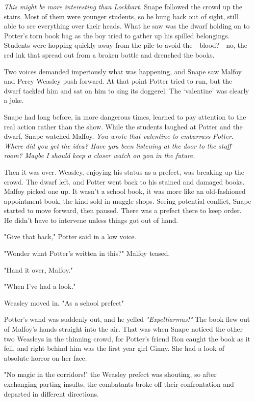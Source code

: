 \emph{This might be more interesting than Lockhart.} Snape followed the crowd up the stairs. Most of them were younger students, so he hung back out of sight, still able to see everything over their heads. What he saw was the dwarf holding on to Potter's torn book bag as the boy tried to gather up his spilled belongings. Students were hopping quickly away from the pile to avoid the—blood?—no, the red ink that spread out from a broken bottle and drenched the books.

Two voices demanded imperiously what was happening, and Snape saw Malfoy and Percy Weasley push forward. At that point Potter tried to run, but the dwarf tackled him and sat on him to sing its doggerel. The `valentine' was clearly a joke.

Snape had long before, in more dangerous times, learned to pay attention to the real action rather than the show. While the students laughed at Potter and the dwarf, Snape watched Malfoy. \emph{You wrote that valentine to embarrass Potter. Where did you get the idea? Have you been listening at the door to the staff room? Maybe I should keep a closer watch on you in the future.}

Then it was over. Weasley, enjoying his status as a prefect, was breaking up the crowd. The dwarf left, and Potter went back to his stained and damaged books. Malfoy picked one up. It wasn't a school book, it was more like an old-fashioned appointment book, the kind sold in muggle shops. Seeing potential conflict, Snape started to move forward, then paused. There was a prefect there to keep order. He didn't have to intervene unless things got out of hand.

"Give that back," Potter said in a low voice.

"Wonder what Potter's written in this?" Malfoy teased.

"Hand it over, Malfoy."

"When I've had a look."

Weasley moved in. "As a school prefect{\el}"

Potter's wand was suddenly out, and he yelled \emph{"Expelliarmus!"} The book flew out of Malfoy's hands straight into the air. That was when Snape noticed the other two Weasleys in the thinning crowd, for Potter's friend Ron caught the book as it fell, and right behind him was the first year girl Ginny. She had a look of absolute horror on her face.

"No magic in the corridors!" the Weasley prefect was shouting, so after exchanging parting insults, the combatants broke off their confrontation and departed in different directions.

